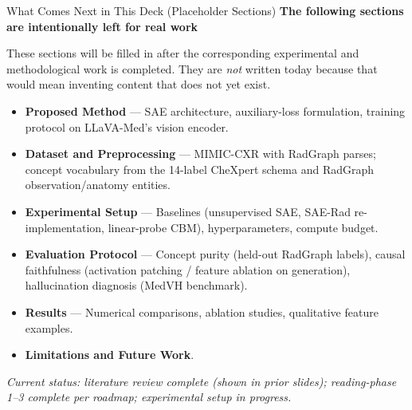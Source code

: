 \documentclass[aspectratio=169,11pt]{beamer}
\begin{document}
\begin{frame}{What Comes Next in This Deck (Placeholder Sections)}
    \textbf{The following sections are intentionally left for real work}

    \vspace{0.5em}
    These sections will be filled in after the corresponding experimental and methodological work is completed. They are \emph{not} written today because that would mean inventing content that does not yet exist.

    \vspace{0.6em}
    \begin{itemize}
        \item \textbf{Proposed Method} --- SAE architecture, auxiliary-loss formulation, training protocol on LLaVA-Med's vision encoder.
        \item \textbf{Dataset and Preprocessing} --- MIMIC-CXR with RadGraph parses; concept vocabulary from the 14-label CheXpert schema and RadGraph observation/anatomy entities.
        \item \textbf{Experimental Setup} --- Baselines (unsupervised SAE, SAE-Rad re-implementation, linear-probe CBM), hyperparameters, compute budget.
        \item \textbf{Evaluation Protocol} --- Concept purity (held-out RadGraph labels), causal faithfulness (activation patching / feature ablation on generation), hallucination diagnosis (MedVH benchmark).
        \item \textbf{Results} --- Numerical comparisons, ablation studies, qualitative feature examples.
        \item \textbf{Limitations and Future Work}.
    \end{itemize}

    \vspace{0.5em}
    \small \textit{Current status: literature review complete (shown in prior slides); reading-phase 1--3 complete per roadmap; experimental setup in progress.}
\end{frame}
\end{document}
